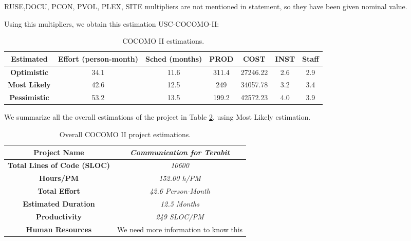 \documentclass{article}
\begin{document}
RUSE,DOCU, PCON, PVOL, PLEX, SITE multipliers are not mentioned in statement, so they have been given nominal value.



Using this multipliers, we obtain this estimation USC-COCOMO-II:

\begin{table}
\begin{tabular}{c|c|c|c|c|c|c}
\textbf{Estimated} & \textbf{Effort (person-month)} & \textbf{Sched (months)} & \textbf{PROD} & \textbf{COST} & \textbf{INST} & \textbf{Staff} \\ \hline
\textbf{Optimistic} & 34.1 & 11.6 & 311.4 & 27246.22 & 2.6 & 2.9 \\
\textbf{Most Likely} & 42.6& 12.5 & 249 & 34057.78 & 3.2 & 3.4 \\
\textbf{Pessimistic} & 53.2 & 13.5 &199.2 & 42572.23 & 4.0 & 3.9\\ \hline
\end{tabular}
\label{tbl_Problem2}
\caption{COCOMO II estimations.}
\end{table}

We summarize all the overall estimations of the project in Table \ref{tbl_Problem1_ALL}, using Most Likely estimation.

\begin{table}
\begin{tabular}{|c|c|} \hline
\textbf{Project Name} & \emph{Communication for Terabit} \\ \hline
\textbf{Total Lines of Code (SLOC)} & \emph{10600} \\ \hline
\textbf{Hours/PM} & \emph{152.00 h/PM} \\ \hline
\textbf{Total Effort} & \emph{42.6 Person-Month} \\ \hline
\textbf{Estimated Duration} & \emph{12.5 Months} \\ \hline
\textbf{Productivity} & \emph{249 SLOC/PM} \\ \hline
\textbf{Human Resources} & We need more information to know this \\ \hline
\end{tabular}
\label{tbl_Problem1_ALL}
\caption{Overall COCOMO II project estimations.}
\end{table}

\newpage
\appendix


\end{document}
